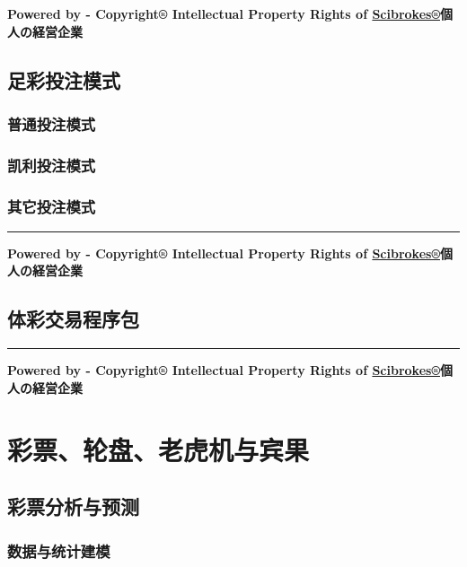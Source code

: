 \documentclass[]{book}
\theoremstyle{definition}
\theoremstyle{definition}
\theoremstyle{definition}
\theoremstyle{remark}
\begin{document}
\textbf{Powered by - Copyright® Intellectual Property Rights of
\href{http://www.scibrokes.com}{Scibrokes®}個人の経営企業}

\section{足彩投注模式}

\subsection{普通投注模式}

\subsection{凯利投注模式}

\subsection{其它投注模式}

\begin{center}\rule{0.5\linewidth}{\linethickness}\end{center}

\textbf{Powered by - Copyright® Intellectual Property Rights of
\href{http://www.scibrokes.com}{Scibrokes®}個人の経営企業}

\section{体彩交易程序包}

\begin{center}\rule{0.5\linewidth}{\linethickness}\end{center}

\textbf{Powered by - Copyright® Intellectual Property Rights of
\href{http://www.scibrokes.com}{Scibrokes®}個人の経営企業}

\hypertarget{lottery}{%
\chapter{彩票、轮盘、老虎机与宾果}\label{lottery}}

\section{彩票分析与预测}

\subsection{数据与统计建模}
\end{document}
